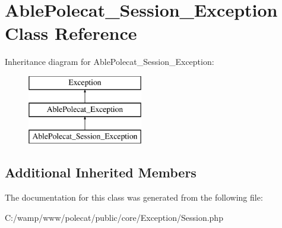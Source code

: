 \hypertarget{class_able_polecat___session___exception}{}\section{Able\+Polecat\+\_\+\+Session\+\_\+\+Exception Class Reference}
\label{class_able_polecat___session___exception}
Inheritance diagram for Able\+Polecat\+\_\+\+Session\+\_\+\+Exception\+:\begin{figure}[H]
\begin{center}
\leavevmode
\includegraphics[height=3.000000cm]{class_able_polecat___session___exception}
\end{center}
\end{figure}
\subsection*{Additional Inherited Members}


The documentation for this class was generated from the following file\+:\begin{DoxyCompactItemize}
\item 
C\+:/wamp/www/polecat/public/core/\+Exception/Session.\+php\end{DoxyCompactItemize}
